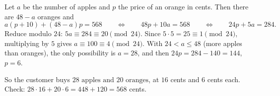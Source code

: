 Let $a$ be the number of apples and $p$ the price of an orange in cents. Then there are $48-a$ oranges and
\[
a(p+10)+(48-a)p=568\qquad\Longleftrightarrow\qquad48p+10a=568\qquad\Longleftrightarrow\qquad24p+5a=284 .
\]
Reduce modulo $24$: $5a\equiv284\equiv20\pmod{24}$. Since $5\cdot5=25\equiv1\pmod{24}$, multiplying by $5$ gives $a\equiv100\equiv4\pmod{24}$. With $24<a\le48$ (more apples than oranges), the only possibility is $a=28$, and then $24p=284-140=144$, $p=6$.

So the customer buys $\boxed{28\text{ apples and }20\text{ oranges}}$, at $16$ cents and $6$ cents each. Check: $28\cdot16+20\cdot6=448+120=568$ cents.

